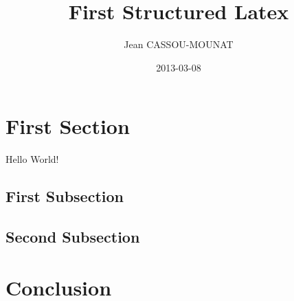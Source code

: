 \documentclass{article}
\title{First Structured Latex}
\date{2013-03-08}
\author{Jean CASSOU-MOUNAT}
\begin{document}
\maketitle
{}
\newpage
{}

\section{First Section}

Hello World!

\subsection{First Subsection}


\subsection{Second Subsection}

\section{Conclusion}
\end{document}
